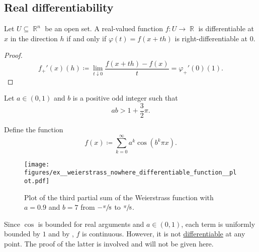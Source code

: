\subsection{Real differentiability}\label{subsec:real_differentiability}

\begin{proposition}\label{thm:real_valued_differentiability}
  Let \( U \subseteq \BbbR^n \) be an open set. A real-valued function \( f: U \to \BbbR \) is differentiable at \( x \) in the direction \( h \) if and only if \( \varphi(t) = f(x + th) \) is right-differentiable at \( 0 \).
\end{proposition}
\begin{proof}
  \begin{equation*}
    f_+'(x)(h) \coloneqq \lim_{t \downarrow 0} \frac {f(x + th) - f(x)} t = \varphi_+'(0)(1).
  \end{equation*}
\end{proof}

\begin{example}\label{ex:weierstrass_nowhere_differentiable_function}\mcite\cite[]{Фихтенгольц1968Том2}
  Let \( a \in (0, 1) \) and \( b \) is a positive odd integer such that
  \begin{equation*}
    ab > 1 + \frac 3 2 \pi.
  \end{equation*}

  Define the function
  \begin{equation*}
    f(x) \coloneqq \sum_{k=0}^\infty a^k \cos(b^k \pi x).
  \end{equation*}

  \begin{figure}
    \centering
    \texttt{[image: figures/ex\_\_weierstrass\_nowhere\_differentiable\_function\_\_plot.pdf]}
    \caption
    {
      Plot of the third partial sum of the Weierstrass function with \( a = 0.9 \) and \( b = 7 \) from \( -\sfrac \pi 8 \) to \( \sfrac \pi 8 \).
    }
    \label{ex:weierstrass_nowhere_differentiable_function/plot}
  \end{figure}

  Since \( \cos \) is bounded for real arguments and \( a \in (0, 1) \), each term is uniformly bounded by \( 1 \) and by , \( f \) is continuous. However, it is not \hyperref[def:differentiability]{differentiable} at any point. The proof of the latter is involved and will not be given here.
\end{example}
